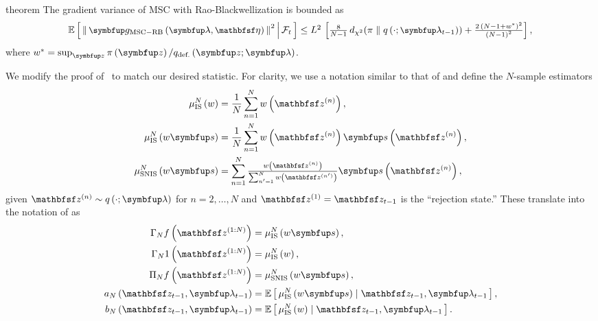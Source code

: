 \begin{theoremEnd}{theorem}\label{thm:mscrb}
  The gradient variance of MSC with Rao-Blackwellization is bounded as
  \begin{align*}
  {\textstyle\small
    \E{ \norm{ \vg_{\mathrm{MSC-RB}}\left(\vlambda, \rvveta\right) }^2 \,\middle|\, \mathcal{F}_{t} } \leq
    L^2 \, \left[
    \frac{8}{N-1}\,\DChi{\pi}{q\left(\cdot; \vlambda_{t-1}\right)}
    +
    \frac{{2\,\left(N - 1 + w^*\right)}^2}{{\left(N - 1\right)}^2}
    \right],
  }
  \end{align*}
  where \(w^* = \sup_{\vz} \pi\left(\vz\right) / q_{\text{def.}}\left(\vz;\vlambda\right)\).
\end{theoremEnd}
\begin{proofEnd}

  We modify the proof of~\citet[Theorem 3]{cardoso_brsnis_2022} to match our desired statistic.
  For clarity, we use a notation similar to that of \citet{10.1214/17-STS611} and define the \(N\)-sample estimators
  \begin{align*}
    \mu^{N}_{\text{IS}}\left(w\right)
    &= 
    \frac{1}{N} \sum^{N}_{n=1} w\left(\rvvz^{(n)}\right),
    \\
    \mu^{N}_{\text{IS}}\left(w\vs\right)
    &= 
    \frac{1}{N} \sum^{N}_{n=1} w\left(\rvvz^{(n)}\right) \vs\left(\rvvz^{(n)}\right),
    \\
    \mu^{N}_{\text{SNIS}}\left(w\vs\right)
    &= 
    \sum^{N}_{n=1} {\textstyle\frac{w\left(\rvvz^{(n)}\right)}{ \sum^{N}_{n^{\prime}=1} w\left(\rvvz^{(n^{\prime})}\right) }} \vs\left(\rvvz^{(n)}\right),
  \end{align*}
  given \(\rvvz^{(n)} \sim q\left(\cdot; \vlambda\right)\) for \(n=2, \ldots, N\) and \(\rvvz^{(1)} = \rvvz_{t-1}\) is the ``rejection state.''
  These translate into the notation of \citet{cardoso_brsnis_2022} as
  \begin{align*}
    {\Gamma_N}f\left(\rvvz^{(1:N)}\right) &= 
    \mu^{N}_{\text{IS}}\left(w\vs\right),
    \\
    {\Gamma_N}1\left(\rvvz^{(1:N)}\right) &=
    \mu^{N}_{\text{IS}}\left(w\right),
    \\
    {\Pi_N}f\left(\rvvz^{(1:N)}\right) &=
    \mu^{N}_{\text{SNIS}}\left(w\vs\right),
    \\
    a_N\left(\rvvz_{t-1}, \vlambda_{t-1}\right) 
    &= 
    \E{ \mu^{N}_{\text{IS}}\left(w\vs\right) \mid \rvvz_{t-1}, \vlambda_{t-1} },
    \\
    b_N\left(\rvvz_{t-1}, \vlambda_{t-1}\right)
    &= 
    \E{ \mu^{N}_{\text{IS}}\left(w\right) \mid \rvvz_{t-1}, \vlambda_{t-1} }.
  \end{align*}


\end{proofEnd}
